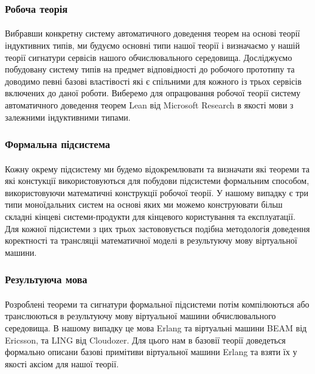 \documentclass[11pt,oneside]{article}
\begin{document}
\subsubsection{Робоча теорія}

   \paragraph{}
   Вибравши конкретну систему автоматичного доведення теорем на основі теорії індуктивних типів,
   ми будуємо основні типи нашої теорії і визначаємо у нашій теорії сигнатури сервісів
   нашого обчислювального середовища. Досліджуємо побудовану систему типів на предмет
   відповідності до робочого прототипу та доводимо певні базові властівості які є спільними для кожного із трьох
   сервісів включених до даної роботи. Виберемо для опрацювання робочої теорії
   систему автоматичного доведення теорем Lean від Microsoft Research в якості мови
   з залежними індуктивними типами.

\subsubsection{Формальна підсистема}

   \paragraph{}
   Кожну окрему підсистему ми будемо відокремлювати та визначати які теореми
   та які констукції використовуються для побудови підсистеми формальним способом,
   використовуючи математичні конструкції робочої теорії. У нашому випадку є три
   типи моноїдальних систем на основі яких ми можемо конструювати більш складні
   кінцеві системи-продукти для кінцевого користування та експлуатації.
   Для кожної підсистеми з цих трьох застововується подібна методологія
   доведення коректності та трансляціі математичної моделі в результуючу
   мову віртуальної машини.

\subsubsection{Результуюча мова}

   \paragraph{}
   Розроблені теореми та сигнатури
   формальної підсистеми потім компілюються або транслюються в результуючу мову віртуальної машини
   обчислювального середовища. В нашому випадку це мова Erlang та віртуальні
   машини BEAM від Ericsson, та LING від Cloudozer. Для цього нам в базовії теорії доведеться
   формально описани базові примітиви віртуальної машини Erlang та взяти їх
   у якості аксіом для нашої теорії.
\end{document}
